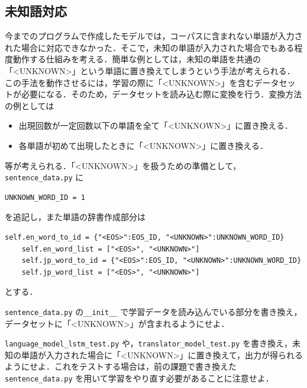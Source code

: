   \subsection{未知語対応}
 今までのプログラムで作成したモデルでは，コーパスに含まれない単語が入力された場合に対応できなかった．そこで，未知の単語が入力された場合でもある程度動作する仕組みを考える．簡単な例としては，未知の単語を共通の「\textless UNKNOWN\textgreater 」という単語に置き換えてしまうという手法が考えられる．この手法を動作させるには，学習の際に「\textless UNKNOWN\textgreater 」を含むデータセットが必要になる．そのため，データセットを読み込む際に変換を行う．変換方法の例としては
\begin{itemize}
\item 出現回数が一定回数以下の単語を全て「\textless UNKNOWN\textgreater 」に置き換える．
\item 各単語が初めて出現したときに「\textless UNKNOWN\textgreater 」に置き換える．
\end{itemize}
等が考えられる．「\textless UNKNOWN\textgreater 」を扱うための準備として，\verb+sentence_data.py+ に
  \begin{lstlisting}[basicstyle=\ttfamily\footnotesize, frame=single]
UNKNOWN_WORD_ID = 1
  \end{lstlisting}
を追記し，また単語の辞書作成部分は
  \begin{lstlisting}[basicstyle=\ttfamily\footnotesize, frame=single]
    self.en_word_to_id = {"<EOS>":EOS_ID, "<UNKNOWN>":UNKNOWN_WORD_ID}
    self.en_word_list = ["<EOS>", "<UNKNOWN>"]
    self.jp_word_to_id = {"<EOS>":EOS_ID, "<UNKNOWN>":UNKNOWN_WORD_ID}
    self.jp_word_list = ["<EOS>", "<UNKNOWN>"]
  \end{lstlisting}
とする．
 \begin{practice}
  \verb+sentence_data.py+ の\verb+__init__+ で学習データを読み込んでいる部分を書き換え，データセットに「\textless UNKNOWN\textgreater 」が含まれるようにせよ．
 \end{practice}
 \begin{practice}
  \verb+language_model_lstm_test.py+ や，\verb+translator_model_test.py+ を書き換え，未知の単語が入力された場合に「\textless UNKNOWN\textgreater 」に置き換えて，出力が得られるようにせよ．これをテストする場合は，前の課題で書き換えた\verb+sentence_data.py+ を用いて学習をやり直す必要があることに注意せよ．
 \end{practice}

